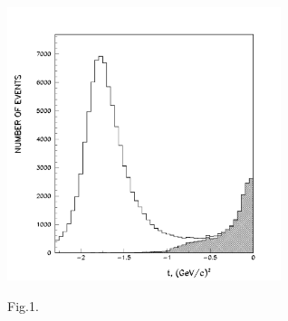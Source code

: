 \documentclass[a4paper,12pt]{article}
\begin{document}
    \begin{figure}[hbt]
      \begin{center}
        \includegraphics[width=8cm]{dist.pdf}
      \end{center}
      \vspace{0.4mm}
      Fig.1.

    \end{figure}
\end{document}
